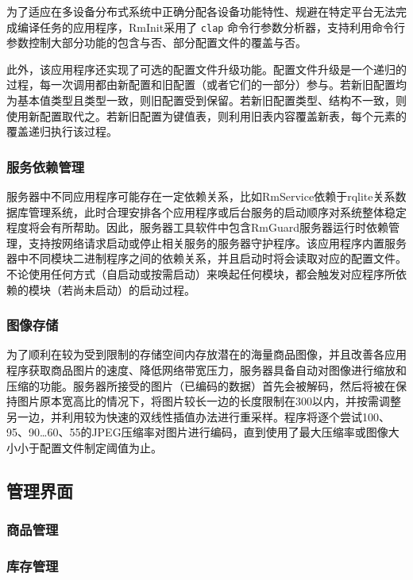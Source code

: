 为了适应在多设备分布式系统中正确分配各设备功能特性、规避在特定平台无法完成编译任务的应用程序，RmInit采用了 \verb|clap| 命令行参数分析器，支持利用命令行参数控制大部分功能的包含与否、部分配置文件的覆盖与否。

此外，该应用程序还实现了可选的配置文件升级功能。配置文件升级是一个递归的过程，每一次调用都由新配置和旧配置（或者它们的一部分）参与。若新旧配置均为基本值类型且类型一致，则旧配置受到保留。若新旧配置类型、结构不一致，则使用新配置取代之。若新旧配置为键值表，则利用旧表内容覆盖新表，每个元素的覆盖递归执行该过程。

\subsubsection{服务依赖管理}
服务器中不同应用程序可能存在一定依赖关系，比如RmService依赖于rqlite关系数据库管理系统，此时合理安排各个应用程序或后台服务的启动顺序对系统整体稳定程度将会有所帮助。因此，服务器工具软件中包含RmGuard服务器运行时依赖管理，支持按网络请求启动或停止相关服务的服务器守护程序。该应用程序内置服务器中不同模块二进制程序之间的依赖关系，并且启动时将会读取对应的配置文件。不论使用任何方式（自启动或按需启动）来唤起任何模块，都会触发对应程序所依赖的模块（若尚未启动）的启动过程。

\subsubsection{图像存储}
为了顺利在较为受到限制的存储空间内存放潜在的海量商品图像，并且改善各应用程序获取商品图片的速度、降低网络带宽压力，服务器具备自动对图像进行缩放和压缩的功能。服务器所接受的图片（已编码的数据）首先会被解码，然后将被在保持图片原本宽高比的情况下，将图片较长一边的长度限制在300以内，并按需调整另一边，并利用较为快速的双线性插值办法进行重采样。程序将逐个尝试100、95、90\ldots60、55的JPEG压缩率对图片进行编码，直到使用了最大压缩率或图像大小小于配置文件制定阈值为止。

\subsection{管理界面}

\subsubsection{商品管理}

\subsubsection{库存管理}

